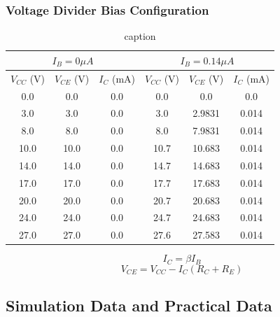 \documentclass[12pt]{article}
\begin{document}
\subsubsection{Voltage Divider Bias Configuration}
\bgroup
\def\arraystretch{1.5}
\begin{table}[h!]
    \centering
    \begin{tabular}{|c|c|c||c|c|c|}
        \hline
        \multicolumn{3}{|c||}{$I_B = 0 \mu A$} & \multicolumn{3}{|c|}{$I_B = 0.14 \mu A$} \\
        \hline
        $V_{CC}$ (V) & $V_{CE}$ (V) & $I_C$ (mA) & $V_{CC}$ (V) & $V_{CE}$ (V) & $I_C$ (mA) \\ \hline
        0.0 & 0.0 & 0.0 & 0.0 & 0.0 & 0.0 \\
        3.0 & 3.0 & 0.0 & 3.0 & 2.9831 & 0.014 \\
        8.0 & 8.0 & 0.0 & 8.0 & 7.9831 & 0.014 \\
        10.0 & 10.0 & 0.0 & 10.7 & 10.683 & 0.014 \\
        14.0 & 14.0 & 0.0 & 14.7 & 14.683 & 0.014 \\
        17.0 & 17.0 & 0.0 & 17.7 & 17.683 & 0.014 \\
        20.0 & 20.0 & 0.0 & 20.7 & 20.683 & 0.014 \\
        24.0 & 24.0 & 0.0 & 24.7 & 24.683 & 0.014 \\
        27.0 & 27.0 & 0.0 & 27.6 & 27.583 & 0.014 \\
        \hline
    \end{tabular}
    \caption{caption}
    \label{Theoretical Voltage Divider Bias}
\end{table}
\egroup
\vspace{-20pt}
\[
    I_C = \beta I_B
\] \[
    V_{CE} = V_{CC} - I_C (R_C + R_E)
\]

\subsection{Simulation Data and Practical Data}
\end{document}
